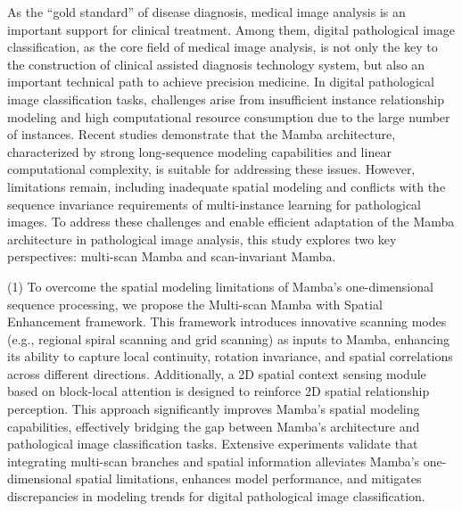 \begin{eabstract}	%
As the ``gold standard'' of disease diagnosis, medical image analysis is an important support for clinical treatment. Among them, digital pathological image classification, as the core field of medical image analysis, is not only the key to the construction of clinical assisted diagnosis technology system, but also an important technical path to achieve precision medicine.
In digital pathological image classification tasks, challenges arise from insufficient instance relationship modeling and high computational resource consumption due to the large number of instances. Recent studies demonstrate that the Mamba architecture, characterized by strong long-sequence modeling capabilities and linear computational complexity, is suitable for addressing these issues. However, limitations remain, including inadequate spatial modeling and conflicts with the sequence invariance requirements of multi-instance learning for pathological images.
To address these challenges and enable efficient adaptation of the Mamba architecture in pathological image analysis, this study explores two key perspectives: multi-scan Mamba and scan-invariant Mamba.

(1) To overcome the spatial modeling limitations of Mamba's one-dimensional sequence processing, we propose the Multi-scan Mamba with Spatial Enhancement framework. This framework introduces innovative scanning modes (e.g., regional spiral scanning and grid scanning) as inputs to Mamba, enhancing its ability to capture local continuity, rotation invariance, and spatial correlations across different directions. Additionally, a 2D spatial context sensing module based on block-local attention is designed to reinforce 2D spatial relationship perception. This approach significantly improves Mamba's spatial modeling capabilities, effectively bridging the gap between Mamba's architecture and pathological image classification tasks. Extensive experiments validate that integrating multi-scan branches and spatial information alleviates Mamba's one-dimensional spatial limitations, enhances model performance, and mitigates discrepancies in modeling trends for digital pathological image classification.


\end{eabstract}
